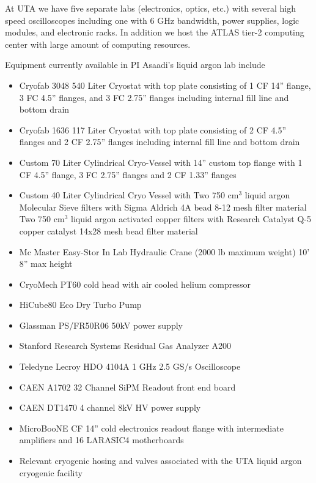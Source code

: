 
At UTA we have five separate labs (electronics, optics, etc.) with several high speed oscilloscopes including one with 6 GHz bandwidth, power supplies, logic modules, and electronic racks. In addition we host the ATLAS tier-2 computing center with large amount of computing resources.

Equipment currently available in PI Asaadi's liquid argon lab include
\begin{itemize}
\item Cryofab 3048 540 Liter Cryostat with top plate consisting of 1 CF 14'' flange, 3 FC 4.5'' flanges, and 3 FC 2.75'' flanges including internal fill line and bottom drain

\item Cryofab 1636 117 Liter Cryostat with top plate consisting of 2 CF 4.5'' flanges and 2 CF 2.75'' flanges including internal fill line and bottom drain

\item Custom 70 Liter Cylindrical Cryo-Vessel with 14'' custom top flange with 1 CF 4.5'' flange, 3 FC 2.75'' flanges and 2 CF 1.33'' flanges

\item Custom 40 Liter Cylindrical Cryo Vessel with Two 750 cm$^3$ liquid argon Molecular Sieve filters with Sigma Aldrich 4A bead 8-12 mesh filter material
Two 750 cm$^3$ liquid argon activated copper filters with Research Catalyst Q-5 copper catalyst 14x28 mesh bead filter material

\item Mc Master Easy-Stor In Lab Hydraulic Crane (2000 lb maximum weight) 10’ 8” max height

\item CryoMech PT60 cold head with air cooled helium compressor

\item HiCube80 Eco Dry Turbo Pump 
 
\item Glassman PS/FR50R06 50kV power supply

\item Stanford Research Systems Residual Gas Analyzer A200

\item Teledyne Lecroy HDO 4104A 1 GHz 2.5 GS/s Oscilloscope 

\item CAEN A1702 32 Channel SiPM Readout front end board

\item CAEN DT1470 4 channel 8kV HV power supply

\item MicroBooNE CF 14” cold electronics readout flange with intermediate amplifiers and 16 LARASIC4 motherboards

\item Relevant cryogenic hosing and valves associated with the UTA liquid argon cryogenic facility

\end{itemize}


